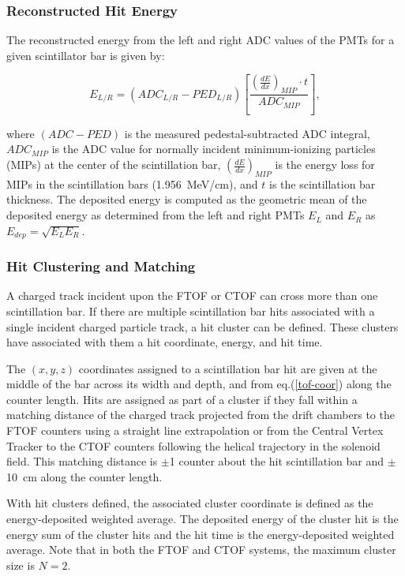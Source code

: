 \documentclass{elsart}
\begin{document}
\subsubsection{Reconstructed Hit Energy}
\label{rec:energy}

The reconstructed energy from the left and right ADC values of the PMTs for a given scintillator bar is given by:

\begin{equation}
E_{L/R} = (ADC_{L/R} - PED_{L/R}) \left [ \frac{\left( \frac{dE}{dx} \right )_{MIP} \cdot t}{ADC_{MIP}} \right ],
\end{equation}

\noindent
where $(ADC  - PED)$ is the measured pedestal-subtracted ADC integral, $ADC_{MIP}$ is the ADC value for normally
incident minimum-ionizing particles (MIPs) at the center of the scintillation bar, $\left( \frac{dE}{dx} \right)_{MIP}$
is the energy loss for MIPs in the scintillation bars (1.956~MeV/cm), and $t$ is the scintillation bar thickness.
The deposited energy is computed as the geometric mean of the deposited energy as determined from the left and
right PMTs $E_L$ and $E_R$ as $E_{dep} = \sqrt{E_L E_R}$.

\subsubsection{Hit Clustering and Matching}

A charged track incident upon the FTOF or CTOF can cross more than one scintillation bar. If there are multiple
scintillation bar hits associated with a single incident charged particle track, a hit cluster can be defined. These
clusters have associated with them a hit coordinate, energy, and hit time.

The $(x,y,z)$ coordinates assigned to a scintillation bar hit are given at the middle of the bar across its width
and depth, and from eq.(\ref{tof-coor}) along the counter length. Hits are assigned as part of a cluster if they
fall within a matching distance of the charged track projected from the drift chambers to the FTOF counters
using a straight line extrapolation or from the Central Vertex Tracker to the CTOF counters following the
helical trajectory in the solenoid field. This matching distance is $\pm$1 counter about the hit scintillation bar
and $\pm$10~cm along the counter length.

With hit clusters defined, the associated cluster coordinate is defined as the energy-deposited weighted average.
The deposited energy of the cluster hit is the energy sum of the cluster hits and the hit time is the energy-deposited
weighted average. Note that in both the FTOF and CTOF systems, the maximum cluster size is $N=2$.
\end{document}
